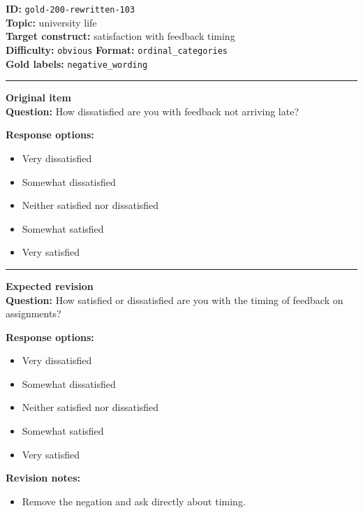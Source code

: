 \documentclass[10pt,a4paper]{article}
\newcommand{\sectionline}{\vspace{0.15em}\hrule\vspace{0.35em}}
\begin{document}
\begin{tcolorbox}[colframe=FlawRed,colback=white,colbacktitle=FlawRed!9,coltitle=black,title={Item 103\hfill Flawed item}]
\textbf{ID:} \texttt{gold-200-rewritten-103}\\
\textbf{Topic:} university life\\
\textbf{Target construct:} satisfaction with feedback timing\\
\textbf{Difficulty:} \texttt{obvious} \quad \textbf{Format:} \texttt{ordinal\_categories}\\
\textbf{Gold labels:} \texttt{negative\_wording}\\
\sectionline
\textbf{Original item}\\
\textbf{Question:} How dissatisfied are you with feedback not arriving late?
\par\textbf{Response options:}
\begin{itemize}
\item Very dissatisfied
\item Somewhat dissatisfied
\item Neither satisfied nor dissatisfied
\item Somewhat satisfied
\item Very satisfied
\end{itemize}
\sectionline
\textbf{Expected revision}\\
\textbf{Question:} How satisfied or dissatisfied are you with the timing of feedback on assignments?
\par\textbf{Response options:}
\begin{itemize}
\item Very dissatisfied
\item Somewhat dissatisfied
\item Neither satisfied nor dissatisfied
\item Somewhat satisfied
\item Very satisfied
\end{itemize}
\par\textbf{Revision notes:}
\begin{itemize}
\item Remove the negation and ask directly about timing.
\end{itemize}
\end{tcolorbox}
\end{document}
